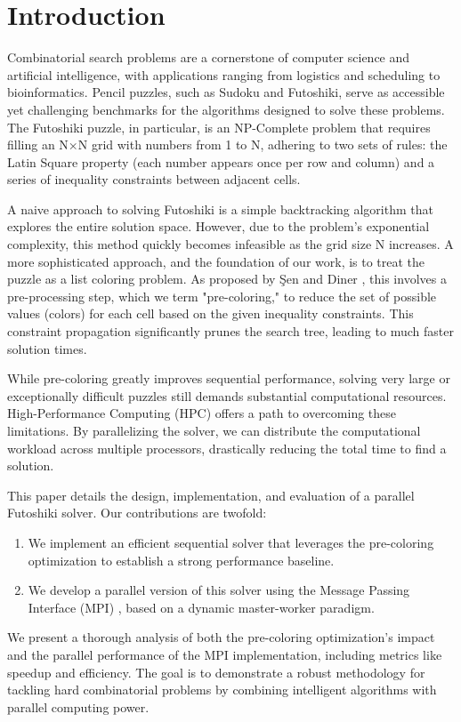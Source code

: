 \section{Introduction}
Combinatorial search problems are a cornerstone of computer science and artificial intelligence, with applications ranging from logistics and scheduling to bioinformatics. Pencil puzzles, such as Sudoku and Futoshiki, serve as accessible yet challenging benchmarks for the algorithms designed to solve these problems. The Futoshiki puzzle, in particular, is an NP-Complete problem \cite{Sen2024Futoshiki} that requires filling an N×N grid with numbers from 1 to N, adhering to two sets of rules: the Latin Square property (each number appears once per row and column) and a series of inequality constraints between adjacent cells.

A naive approach to solving Futoshiki is a simple backtracking algorithm that explores the entire solution space. However, due to the problem's exponential complexity, this method quickly becomes infeasible as the grid size N increases. A more sophisticated approach, and the foundation of our work, is to treat the puzzle as a list coloring problem. As proposed by Şen and Diner \cite{Sen2024Futoshiki}, this involves a pre-processing step, which we term "pre-coloring," to reduce the set of possible values (colors) for each cell based on the given inequality constraints. This constraint propagation significantly prunes the search tree, leading to much faster solution times.

While pre-coloring greatly improves sequential performance, solving very large or exceptionally difficult puzzles still demands substantial computational resources. High-Performance Computing (HPC) offers a path to overcoming these limitations. By parallelizing the solver, we can distribute the computational workload across multiple processors, drastically reducing the total time to find a solution.

This paper details the design, implementation, and evaluation of a parallel Futoshiki solver. Our contributions are twofold:
\begin{enumerate}
    \item We implement an efficient sequential solver that leverages the pre-coloring optimization to establish a strong performance baseline.
    \item We develop a parallel version of this solver using the Message Passing Interface (MPI) \cite{MPIForum2021}, based on a dynamic master-worker paradigm.
\end{enumerate}
We present a thorough analysis of both the pre-coloring optimization's impact and the parallel performance of the MPI implementation, including metrics like speedup and efficiency. The goal is to demonstrate a robust methodology for tackling hard combinatorial problems by combining intelligent algorithms with parallel computing power.
